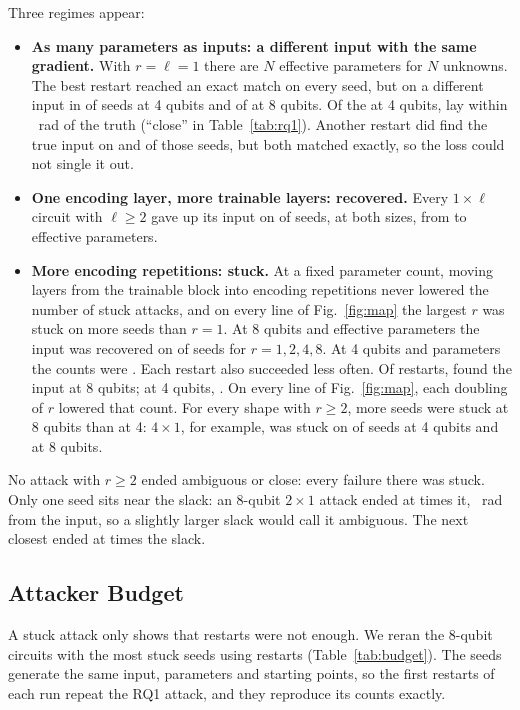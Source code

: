 \documentclass[10pt,conference]{IEEEtran}
\begin{document}
Three regimes appear:
\begin{itemize}
  \item \textbf{As many parameters as inputs: a different input with the same gradient.} With $r = \ell = 1$
  there are $N$ effective parameters for $N$ unknowns. The best restart reached an exact match on
  every seed, but on a different input in \SquareWrongSmall{} of \Seeds{} seeds at 4 qubits and
  \SquareWrongLarge{} of \Seeds{} at 8 qubits. Of the \SquareWrongSmall{} at 4 qubits,
  \SquareCloseSmall{} lay within \SquareCloseMaxErr~rad of the truth (``close'' in Table~\ref{tab:rq1}).
  Another restart did find the true input on \SquareOtherRestartSmall{} and
  \SquareOtherRestartLarge{} of those seeds, but both matched exactly, so the loss could not single
  it out.
  \item \textbf{One encoding layer, more trainable layers: recovered.} Every $1\times\ell$ circuit
  with $\ell\ge 2$ gave up its input on \Seeds{} of \Seeds{} seeds, at both sizes, from
  \ShallowMinParams{} to \ShallowMaxParams{} effective parameters.
  \item \textbf{More encoding repetitions: stuck.} At a fixed parameter count, moving layers from
  the trainable block into encoding repetitions never lowered the number of stuck attacks, and on
  every line of Fig.~\ref{fig:map} the largest $r$ was stuck on more seeds than $r = 1$. At 8 qubits and
  \ParamsTopLarge{} effective parameters the input was recovered on \RecByRepsLarge{} of \Seeds{}
  seeds for $r = 1, 2, 4, 8$. At 4 qubits and \ParamsTopSmall{} parameters the counts were
  \RecByRepsSmall. Each restart also succeeded less often. Of \RestartTries{} restarts, \RestartHitsLarge{}
  found the input at 8 qubits; at 4 qubits, \RestartHitsSmall. On every line of
  Fig.~\ref{fig:map}, each doubling of $r$ lowered that count. For every shape with $r\ge2$, more seeds were stuck at 8 qubits than at 4:
  $4\times1$, for example, was stuck on \StuckFourOneSmall{} of \Seeds{} seeds at 4 qubits and
  \StuckFourOneLarge{} at 8 qubits.
\end{itemize}
No attack with $r\ge2$ ended ambiguous or close: every failure there was stuck. Only one seed sits
near the slack: an 8-qubit $2\times1$ attack ended at \StuckClosestSlack{} times it,
\StuckClosestErr~rad from the input, so a slightly larger slack would call it ambiguous. The next
closest ended at \StuckNextSlack{} times the slack.

\subsection{Attacker Budget}\label{sec:budget}
A stuck attack only shows that \Restarts{} restarts were not enough. We reran the
\BudgetCircuits{} 8-qubit circuits with the most stuck seeds using \BudgetRestarts{} restarts
(Table~\ref{tab:budget}). The seeds generate the same input, parameters and starting points, so
the first \Restarts{} restarts of each run repeat the RQ1 attack, and they reproduce its counts
exactly.
\end{document}
